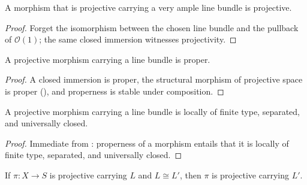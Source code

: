 \begin{lemma}
  \label{lem:projective_with_forget}
  \leanok
  A morphism that is projective carrying a very ample line bundle is
  projective.
\end{lemma}

\begin{proof}
  \leanok
  Forget the isomorphism between the chosen line bundle and the pullback of
  \(\mathcal{O}(1)\); the same closed immersion witnesses projectivity.
\end{proof}

\begin{lemma}
  \label{lem:projective_with_proper}
  \leanok
  A projective morphism carrying a line bundle is proper.
\end{lemma}

\begin{proof}
  \leanok
  A closed immersion is proper, the structural morphism of projective space
  is proper (), and properness is stable
  under composition.
\end{proof}

\begin{lemma}
  \label{lem:projective_with_structural}
  \leanok
  A projective morphism carrying a line bundle is locally of finite type,
  separated, and universally closed.
\end{lemma}

\begin{proof}
  \leanok
  Immediate from : properness of a morphism
  entails that it is locally of finite type, separated, and universally
  closed.
\end{proof}

\begin{lemma}
  \label{lem:projective_with_iso}
  \leanok
  If \(\pi : X \to S\) is projective carrying \(L\) and \(L \cong L'\), then
  \(\pi\) is projective carrying \(L'\).
\end{lemma}

